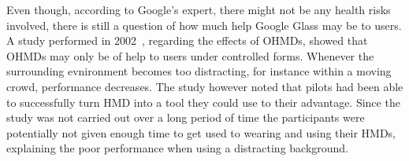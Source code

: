 %
%
Even though, according to Google's expert, there might not be any health risks involved, there is still a question of how much help Google Glass may be to users. A study performed in 2002~\cite{laramee02}, regarding the effects of OHMDs, showed that OHMDs may only be of help to users under controlled forms. Whenever the surrounding evnironment becomes too distracting, for instance within a moving crowd, performance decreases. The study however noted that pilots had been able to successfully turn HMD into a tool they could use to their advantage. Since the study was not carried out over a long period of time the participants were potentially not given enough time to get used to wearing and using their HMDs, explaining the poor performance when using a distracting background.

